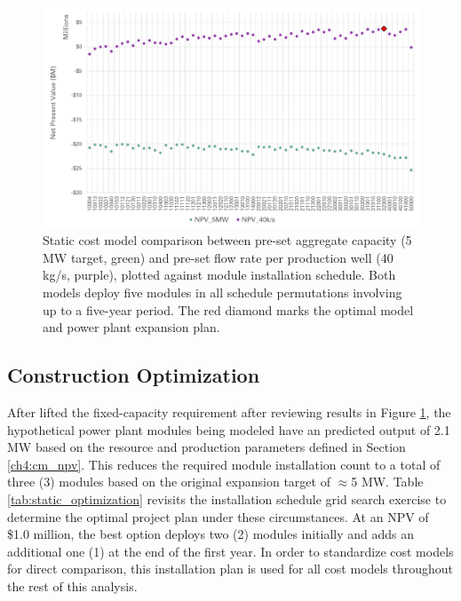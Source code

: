 \begin{figure}[!htp]
\centering
\includegraphics[width=\textwidth]{templates/images/Figure-Static_Model_Construction.png}
\caption[Static cost model comparison]{Static cost model comparison between pre-set aggregate capacity (5 MW target, green) and pre-set flow rate per production well (40 kg/s, purple), plotted against module installation schedule. Both models deploy five modules in all schedule permutations involving up to a five-year period. The red diamond marks the optimal model and power plant expansion plan.}
\label{fig:static_model_compare}
\end{figure}

\subsection{Construction Optimization}

After lifted the fixed-capacity requirement after reviewing results in Figure \ref{fig:static_model_compare}, the hypothetical power plant modules being modeled have an predicted output of 2.1 MW based on the resource and production parameters defined in Section \ref{ch4:cm_npv}. This reduces the required module installation count to a total of three (3) modules based on the original expansion target of $\approx$5 MW. Table \ref{tab:static_optimization} revisits the installation schedule grid search exercise to determine the optimal project plan under these circumstances. At an NPV of \$1.0 million, the best option deploys two (2) modules initially and adds an additional one (1) at the end of the first year. In order to standardize cost models for direct comparison, this installation plan is used for all cost models throughout the rest of this analysis.

